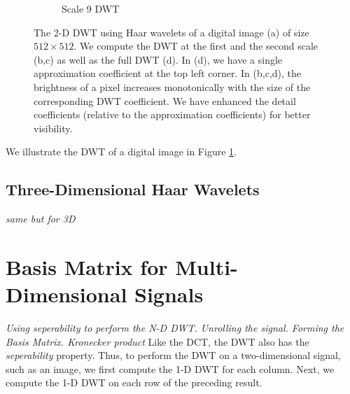 \begin{figure}
\begin{subfigure}{0.4\textwidth}
  \caption{Scale 9 DWT}
\end{subfigure}
\caption[2-D Haar DWT Example]{The 2-D DWT using Haar wavelets of a digital image (a) of size $512\times 512$.
  We compute the DWT at the first and the second scale (b,c) as well as the full DWT (d).
  In (d), we have a single approximation coefficient at the top left corner.
  In (b,c,d), the brightness of a pixel increases monotonically with the size of the corresponding DWT coefficient.
  We have enhanced the detail coefficients (relative to the approximation coefficients) for better visibility.}
\label{fig:dwt2}
\end{figure}
We illustrate the DWT of a digital image in Figure \ref{fig:dwt2}.




\subsection{Three-Dimensional Haar Wavelets}
\emph{same but for 3D}

\section{Basis Matrix for Multi-Dimensional Signals}
\emph{Using seperability to perform the N-D DWT. Unrolling the signal. Forming the Basis Matrix. Kronecker product}
Like the DCT, the DWT also has the \emph{seperability} property.
Thus, to perform the DWT on a two-dimensional signal, such as an image, we first compute the 1-D DWT for each column.
Next, we compute the 1-D DWT on each row of the preceding result.





